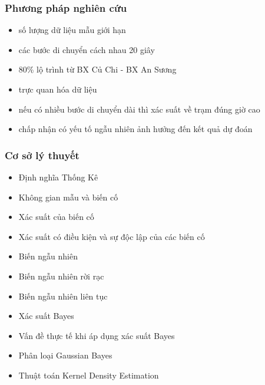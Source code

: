 \documentclass{beamer}
\begin{document}

\begin{frame}
\frametitle{Phương pháp nghiên cứu}
\begin{itemize}
\item số lượng dữ liệu mẫu giới hạn
\item các bước di chuyển cách nhau 20 giây
\item 80\% lộ trình từ BX Củ Chi - BX An Sương
\item trực quan hóa dữ liệu
\item nếu có nhiều bước di chuyển dài thì xác suất về trạm đúng giờ cao
\item chấp nhận có yếu tố ngẫu nhiên ảnh hưởng đến kết quả dự đoán 
\end{itemize}
\end{frame}


\begin{frame}[t]
\frametitle{Cơ sở lý thuyết}
\begin{minipage}{0.48\linewidth}
\begin{itemize}
\item Định nghĩa Thống Kê
\item Không gian mẫu và biến cố
\item Xác suất của biến cố
\item Xác suất có điều kiện và sự độc lập của các biến cố
\item Biến ngẫu nhiên
\item Biến ngẫu nhiên rời rạc
\end{itemize}
\end{minipage}%
\hfill
\begin{minipage}{0.49\linewidth}
\begin{itemize}
\item Biến ngẫu nhiên liên tục
\item Xác suất Bayes
\item Vấn đề thực tế khi áp dụng xác suất Bayes
\item Phân loại Gaussian Bayes
\item Thuật toán Kernel Density Estimation 
\end{itemize}
\end{minipage}
\end{frame}

\end{document}
